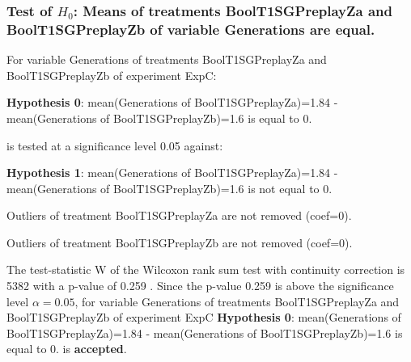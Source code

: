 \begin{frame}[t]
 \frametitle{Test of $H_{0}$: Means of treatments BoolT1SGPreplayZa and BoolT1SGPreplayZb of variable Generations are equal. }
 \scriptsize
 For variable Generations of treatments BoolT1SGPreplayZa and BoolT1SGPreplayZb of experiment ExpC:

\vspace{1mm}
{\bf Hypothesis 0}: mean(Generations of BoolT1SGPreplayZa)=1.84 - mean(Generations of BoolT1SGPreplayZb)=1.6 is equal to 0.


 \begin{center} is tested at a significance level 0.05 against: \end{center}

{\bf Hypothesis 1}: mean(Generations of BoolT1SGPreplayZa)=1.84 - mean(Generations of BoolT1SGPreplayZb)=1.6 is not equal to 0.
\vspace{1mm}
\vspace{1mm}

 Outliers of treatment BoolT1SGPreplayZa  are not removed (coef=0).

 Outliers of treatment BoolT1SGPreplayZb  are not removed (coef=0).
\vspace{1mm}
 
 The test-statistic W of the Wilcoxon rank sum test with continuity correction is 5382 with a p-value of 0.259 .
 Since the p-value 0.259 is above the significance level $\alpha= 0.05 $,
 for variable Generations of treatments BoolT1SGPreplayZa and BoolT1SGPreplayZb of experiment ExpC 
 {\bf Hypothesis 0}: mean(Generations of BoolT1SGPreplayZa)=1.84 - mean(Generations of BoolT1SGPreplayZb)=1.6 is equal to 0.
is {\bf accepted}.

 \end{frame}
